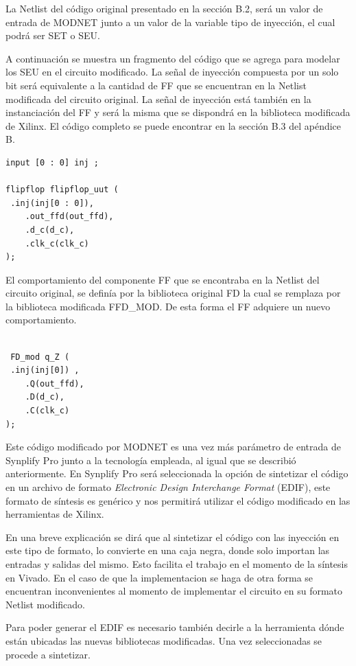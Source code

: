 \documentclass[a4paper,openright,12pt]{report}
\begin{document}
La Netlist del código original presentado en la sección B.2, será un valor de entrada de MODNET junto a un valor de la variable tipo de inyección, el cual podrá ser SET o SEU.



A continuación se muestra  un fragmento del código que se agrega para  modelar los SEU en el circuito modificado.  La señal de inyección compuesta por un solo bit será equivalente  a la cantidad de FF que se encuentran en la Netlist modificada  del circuito original. La señal de inyección está  también en la instanciación  del FF y será la misma que se dispondrá en la biblioteca modificada de Xilinx. El código completo se puede encontrar en la sección B.3 del apéndice B.


\begin{lstlisting}
input [0 : 0] inj ;

flipflop flipflop_uut (
 .inj(inj[0 : 0]),
    .out_ffd(out_ffd),
    .d_c(d_c),
    .clk_c(clk_c)
);
\end{lstlisting}

El comportamiento del componente FF que se encontraba en la Netlist del circuito original, se definía por la biblioteca original FD la cual se remplaza  por la biblioteca modificada FFD\_MOD.  De esta forma el FF adquiere un nuevo comportamiento.
\begin{lstlisting}

 FD_mod q_Z (
 .inj(inj[0]) ,
    .Q(out_ffd),
    .D(d_c),
    .C(clk_c)
);
\end{lstlisting}

Este código modificado por MODNET es una vez más parámetro de entrada de Synplify Pro junto a la tecnología empleada,  al igual que se describió anteriormente. En Synplify Pro  será seleccionada la opción de sintetizar el código en un archivo de formato \textit{Electronic Design Interchange Format} (EDIF), este formato de síntesis es genérico y nos permitirá utilizar el código modificado en las herramientas de Xilinx.

En una breve explicación se dirá  que al sintetizar el código con las inyección en este tipo de formato, lo convierte en una caja negra, donde solo  importan las entradas y salidas del mismo. Esto facilita el trabajo en el momento de la síntesis en Vivado. En el caso de que la implementacion se haga de otra forma se encuentran  inconvenientes  al momento de implementar el circuito en su formato Netlist modificado.

Para poder generar el EDIF es necesario también decirle a la herramienta dónde están ubicadas las nuevas bibliotecas modificadas. Una vez seleccionadas  se procede a  sintetizar.
\end{document}
